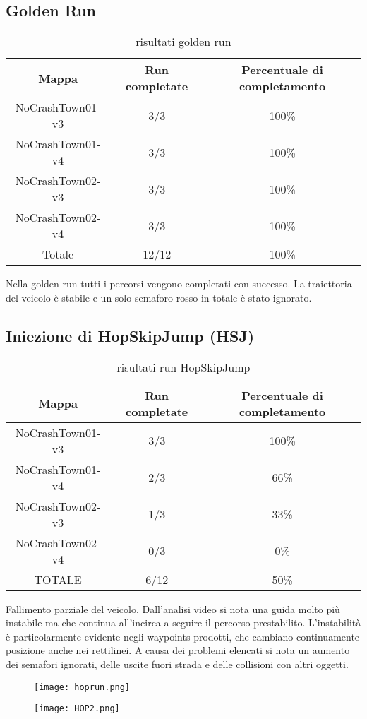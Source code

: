 \subsection{Golden Run}
\begin{table}[h]
    \begin{tabular}{|c|c|c|}
        \hline
        Mappa                   & Run completate & Percentuale di completamento\\
        \hline
        NoCrashTown01-v3        & 3/3            & 100\% \\
        NoCrashTown01-v4        & 3/3            & 100\% \\
        NoCrashTown02-v3        & 3/3            & 100\% \\
        NoCrashTown02-v4        & 3/3            & 100\%  \\
        Totale                  & 12/12          & 100\% \\
        \hline
    \end{tabular}
    \caption{risultati golden run}
Nella golden run tutti i percorsi vengono completati con successo. La traiettoria del veicolo è stabile e un solo semaforo rosso in totale è stato ignorato.
\end{table}
\newpage
\subsection{Iniezione di HopSkipJump (HSJ)}
\begin{table}[h!]
    \begin{tabular}{|c|c|c|}
        \hline
        Mappa                   & Run completate & Percentuale di completamento\\
        \hline
        NoCrashTown01-v3        & 3/3            & 100\% \\
        NoCrashTown01-v4        & 2/3            & 66\% \\
        NoCrashTown02-v3        & 1/3            & 33\% \\
        NoCrashTown02-v4        & 0/3            & 0\%  \\
        TOTALE                  & 6/12           & 50\% \\
        \hline
    \end{tabular}
    \caption{risultati run HopSkipJump}
    \label{tab:hsj}
\end{table}
 Fallimento parziale del veicolo. Dall'analisi video si nota una guida molto più instabile ma che continua all'incirca
a seguire il percorso prestabilito. L'instabilità è particolarmente evidente negli waypoints prodotti, che cambiano continuamente posizione anche nei rettilinei. A causa dei problemi elencati
si nota un aumento dei semafori ignorati, delle uscite fuori strada e delle collisioni con altri oggetti.
\begin{figure}[h]
    \centering
    \parbox{6cm}{
    \texttt{[image: hoprun.png]}
    \label{fig:hop1}}
    \qquad
    \begin{minipage}{6cm}
    \texttt{[image: HOP2.png]}
    \label{fig:hop2}
    \end{minipage}
    \label{fig:hoprun}
    \end{figure}

